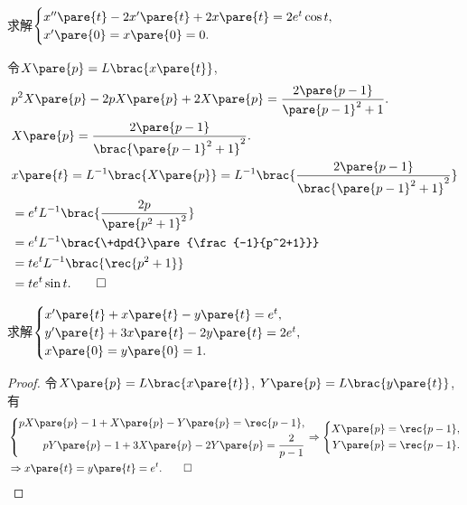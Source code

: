 \documentclass[../ComplexVariable.tex]{subfiles}
\begin{document}
\begin{sample}
    \begin{ex}
        求解$\displaystyle \begin{cases}
            x''\pare{t} - 2x'\pare{t} + 2x\pare{t} = 2e^t\cos t, \\
            x'\pare{0} = x\pare{0} = 0.
        \end{cases}$
    \end{ex}
    \begin{solution}
        令$X\pare{p} = L\brac{x\pare{t}}$,
        \begin{align*}
            & p^2X\pare{p} - 2pX\pare{p} + 2X\pare{p} = \frac{2\pare{p-1}}{\pare{p-1}^2 + 1}. \\
            & X\pare{p} = \frac{2\pare{p-1}}{\brac{\pare{p-1}^2 + 1}^2}. \\
            & x\pare{t} = L^{-1}\brac{X\pare{p}} = L^{-1}\brac{\frac{2\pare{p-1}}{\brac{\pare{p-1}^2+1}^2}} \\
            &= e^t L^{-1}\brac{\frac{2p}{\pare{p^2+1}^2}} \\
            &= e^t L^{-1}\brac{\+dpd{}\pare{\frac{-1}{p^2+1}}} \\
            &= te^t L^{-1}\brac{\rec{p^2+1}} \\
            &= te^t\sin t. \qedhere
        \end{align*}
    \end{solution}
\end{sample}
\begin{sample}
    \begin{ex}
        求解$\displaystyle \begin{cases}
            x'\pare{t} + x\pare{t} - y\pare{t} = e^t, \\
            y'\pare{t} + 3x\pare{t} - 2y\pare{t} = 2e^t, \\
            x\pare{0} = y\pare{0} = 1.
        \end{cases}$
    \end{ex}
    \begin{proof}
        令$X\pare{p} = L\brac{x\pare{t}}$, $Y\pare{p} = L\brac{y\pare{t}}$, 有
        \begin{align*}
            & \left\{ \begin{aligned}
                pX\pare{p} - 1 + X\pare{p} - Y\pare{p} = \rec{p-1}, \\
                pY\pare{p} - 1 + 3X\pare{p} - 2Y\pare{p} = \frac{2}{p-1}
            \end{aligned} \right. \Rightarrow \left\{ \begin{aligned}
                X\pare{p} = \rec{p-1}, \\
                Y\pare{p} = \rec{p-1}.
            \end{aligned} \right.\\
            &\Rightarrow x\pare{t} = y\pare{t} = e^t. \qedhere
        \end{align*}
    \end{proof}
\end{sample}
\end{document}
